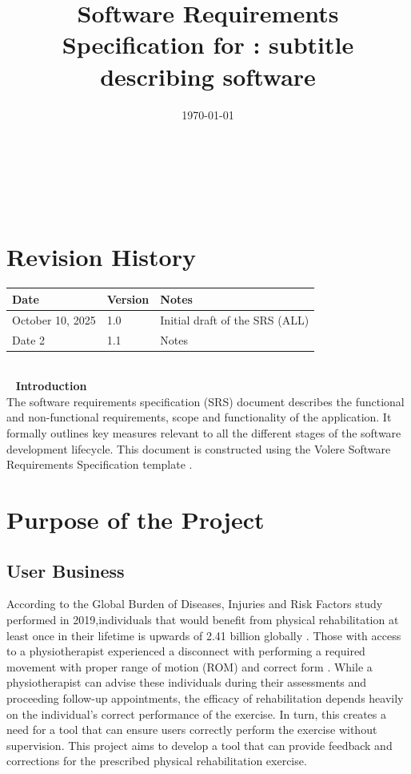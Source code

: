 \documentclass[12pt]{article}
\begin{document}
\title{Software Requirements Specification for \progname: subtitle describing software} 
\author{\authname}
\date{\today}
	
\maketitle

~\newpage


\tableofcontents

~\newpage

\section*{Revision History}

\begin{tabularx}{\textwidth}{p{3cm}p{2cm}X}
\toprule {\textbf{Date}} & {\textbf{Version}} & {\textbf{Notes}}\\
\midrule
October 10, 2025 & 1.0 & Initial draft of the SRS (ALL)\\ 
Date 2 & 1.1 & Notes\\
\bottomrule
\end{tabularx}

~\\

~\newpage
\noindent \textbf{ \large Introduction}\\
The software requirements specification (SRS) document describes the functional and non-functional requirements, scope and functionality of the application. It formally outlines key measures relevant to all the different stages of the software development lifecycle. This document is constructed using the Volere Software Requirements Specification template  \citep{VolereTemplate2012}.

\section{Purpose of the Project}
\subsection{User Business}
According to the Global Burden of Diseases, Injuries and Risk Factors study performed in 2019,individuals that would benefit from physical rehabilitation at least once in their lifetime is upwards of 2.41 billion globally \citep{CiezaEtAl2021}. Those with access to a physiotherapist experienced a disconnect with performing a required movement with proper range of motion (ROM) and correct form \citep{FaberEtAl2015}. While a physiotherapist can advise these individuals during their assessments and proceeding follow-up appointments, the efficacy of rehabilitation depends heavily on the individual's correct performance of the exercise. In turn, this creates a need for a tool that can ensure users correctly perform the exercise without supervision. This project aims to develop a tool that can provide feedback and corrections for the prescribed physical rehabilitation exercise.
\end{document}
